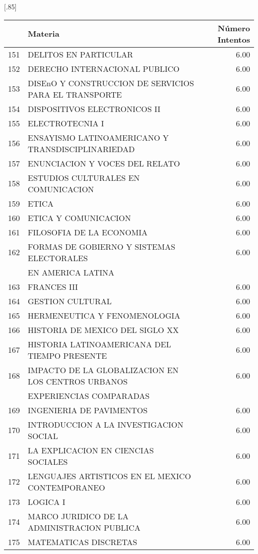\documentclass[12pt]{article}
\begin{document}
\begin{table}[ht]
\centering
\scalebox{0.75}[.85]{
\begin{tabular}{rlr}
  \hline
 & Materia & N\'umero Intentos \\ 
  \hline
  151 & DELITOS EN PARTICULAR & 6.00 \\ 
  152 & DERECHO INTERNACIONAL PUBLICO & 6.00 \\ 
  153 & DISEnO Y CONSTRUCCION DE SERVICIOS PARA EL TRANSPORTE & 6.00 \\ 
  154 & DISPOSITIVOS ELECTRONICOS II & 6.00 \\ 
  155 & ELECTROTECNIA I & 6.00 \\ 
  156 & ENSAYISMO LATINOAMERICANO Y TRANSDISCIPLINARIEDAD & 6.00 \\ 
  157 & ENUNCIACION Y VOCES DEL RELATO & 6.00 \\ 
  158 & ESTUDIOS CULTURALES EN COMUNICACION & 6.00 \\ 
  159 & ETICA & 6.00 \\ 
  160 & ETICA Y COMUNICACION & 6.00 \\ 
  161 & FILOSOFIA DE LA ECONOMIA & 6.00 \\ 
  162 & FORMAS DE GOBIERNO Y SISTEMAS ELECTORALES  & 6.00 \\ 
   &  EN AMERICA LATINA &  \\ 
  163 & FRANCES III & 6.00 \\ 
  164 & GESTION CULTURAL & 6.00 \\ 
  165 & HERMENEUTICA Y FENOMENOLOGIA & 6.00 \\ 
  166 & HISTORIA DE MEXICO DEL SIGLO XX & 6.00 \\ 
  167 & HISTORIA LATINOAMERICANA DEL TIEMPO PRESENTE & 6.00 \\ 
  168 & IMPACTO DE LA GLOBALIZACION EN LOS CENTROS URBANOS & 6.00 \\ 
  &  EXPERIENCIAS COMPARADAS &  \\ 
 169 & INGENIERIA DE PAVIMENTOS & 6.00 \\ 
  170 & INTRODUCCION A LA INVESTIGACION SOCIAL & 6.00 \\ 
  171 & LA EXPLICACION EN CIENCIAS SOCIALES & 6.00 \\ 
  172 & LENGUAJES ARTISTICOS EN EL MEXICO CONTEMPORANEO & 6.00 \\ 
  173 & LOGICA I & 6.00 \\ 
  174 & MARCO JURIDICO DE LA ADMINISTRACION PUBLICA & 6.00 \\ 
  175 & MATEMATICAS DISCRETAS & 6.00 \\ 

\end{tabular}}
\end{table}
\end{document}
